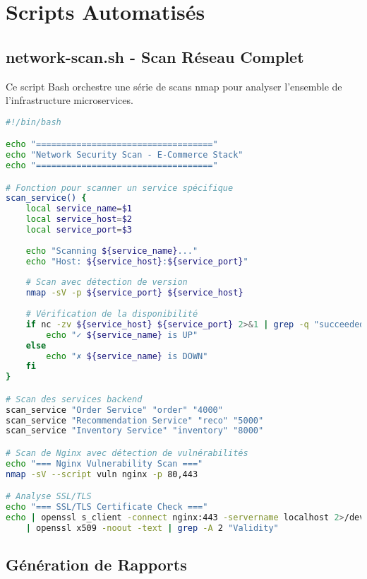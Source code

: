 \section{Scripts Automatisés}

\subsection{network-scan.sh - Scan Réseau Complet}

Ce script Bash orchestre une série de scans nmap pour analyser l'ensemble de l'infrastructure microservices.

\begin{lstlisting}[language=bash, caption=network-scan.sh (extrait), basicstyle=\ttfamily\tiny]
#!/bin/bash

echo "==================================="
echo "Network Security Scan - E-Commerce Stack"
echo "==================================="

# Fonction pour scanner un service spécifique
scan_service() {
    local service_name=$1
    local service_host=$2
    local service_port=$3
    
    echo "Scanning ${service_name}..."
    echo "Host: ${service_host}:${service_port}"
    
    # Scan avec détection de version
    nmap -sV -p ${service_port} ${service_host}
    
    # Vérification de la disponibilité
    if nc -zv ${service_host} ${service_port} 2>&1 | grep -q "succeeded"; then
        echo "✓ ${service_name} is UP"
    else
        echo "✗ ${service_name} is DOWN"
    fi
}

# Scan des services backend
scan_service "Order Service" "order" "4000"
scan_service "Recommendation Service" "reco" "5000"
scan_service "Inventory Service" "inventory" "8000"

# Scan de Nginx avec détection de vulnérabilités
echo "=== Nginx Vulnerability Scan ==="
nmap -sV --script vuln nginx -p 80,443

# Analyse SSL/TLS
echo "=== SSL/TLS Certificate Check ==="
echo | openssl s_client -connect nginx:443 -servername localhost 2>/dev/null \
    | openssl x509 -noout -text | grep -A 2 "Validity"
\end{lstlisting}

\subsection{Génération de Rapports}

